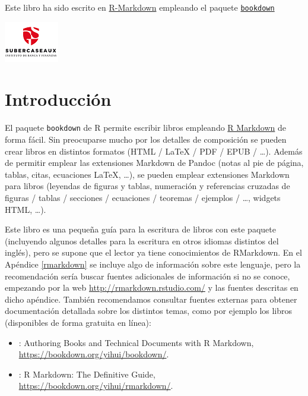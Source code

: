 \documentclass[]{book}
\theoremstyle{definition}
\theoremstyle{definition}
\theoremstyle{definition}
\theoremstyle{remark}
\begin{document}
Este libro ha sido escrito en
\href{http://rmarkdown.rstudio.com}{R-Markdown} empleando el paquete
\href{https://bookdown.org/yihui/bookdown/}{\texttt{bookdown}}

\begin{flushleft}\includegraphics{images/IconoIGS} \end{flushleft}

\chapter{Introducción}\label{intro}

El paquete \texttt{bookdown} \citep{R-bookdown} de R \citep{R-base}
permite escribir libros empleando \href{http://rmarkdown.rstudio.com}{R
Markdown} de forma fácil. Sin preocuparse mucho por los detalles de
composición se pueden crear libros en distintos formatos (HTML / LaTeX /
PDF / EPUB / \ldots{}). Además de permitir emplear las extensiones
Markdown de Pandoc (notas al pie de página, tablas, citas, ecuaciones
LaTeX, \ldots{}), se pueden emplear extensiones Markdown para libros
(leyendas de figuras y tablas, numeración y referencias cruzadas de
figuras / tablas / secciones / ecuaciones / teoremas / ejemplos /
\ldots{}, widgets HTML, \ldots{}).

Este libro es una pequeña guía para la escritura de libros con este
paquete (incluyendo algunos detalles para la escritura en otros idiomas
distintos del inglés), pero se supone que el lector ya tiene
conocimientos de RMarkdown. En el Apéndice \ref{rmarkdown} se incluye
algo de información sobre este lenguaje, pero la recomendación sería
buscar fuentes adicionales de información si no se conoce, empezando por
la web \url{http://rmarkdown.rstudio.com/} y las fuentes descritas en
dicho apéndice. También recomendamos consultar fuentes externas para
obtener documentación detallada sobre los distintos temas, como por
ejemplo los libros (disponibles de forma gratuita en línea):

\begin{itemize}
\item
  \citet{R-bookdown} : Authoring Books and Technical Documents with R
  Markdown, \url{https://bookdown.org/yihui/bookdown/}.
\item
  \citet{xie2018r} : R Markdown: The Definitive Guide,
  \url{https://bookdown.org/yihui/rmarkdown/}.
\end{itemize}
\end{document}
